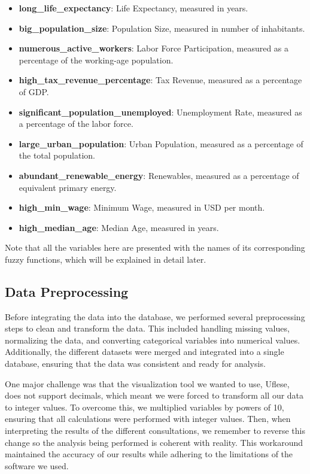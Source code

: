 \documentclass[fleqn,11pt]{article}
\begin{document}
\begin{itemize}
    \item \textbf{long\_life\_expectancy}: Life Expectancy, measured in years.
    \item \textbf{big\_population\_size}: Population Size, measured in number of inhabitants.
    \item \textbf{numerous\_active\_workers}: Labor Force Participation, measured as a percentage of the working-age population.
    \item \textbf{high\_tax\_revenue\_percentage}: Tax Revenue, measured as a percentage of GDP.
    \item \textbf{significant\_population\_unemployed}: Unemployment Rate, measured as a percentage of the labor force.
    \item \textbf{large\_urban\_population}: Urban Population, measured as a percentage of the total population.
    \item \textbf{abundant\_renewable\_energy}: Renewables, measured as a percentage of equivalent primary energy.
    \item \textbf{high\_min\_wage}: Minimum Wage, measured in USD per month.
    \item \textbf{high\_median\_age}: Median Age, measured in years.
\end{itemize}
Note that all the variables here are presented with the names of its corresponding fuzzy functions, which will be explained in detail later.

\newpage
\subsection{Data Preprocessing}

Before integrating the data into the database, we performed several preprocessing steps to clean and transform the data.
This included handling missing values, normalizing the data, and converting categorical variables into numerical values.
Additionally, the different datasets were merged and integrated into a single database, ensuring that the data was consistent and ready for analysis.

One major challenge was that the visualization tool we wanted to use, Uflese, does not support decimals, which meant we were forced to transform all our data to integer values. To overcome this, we multiplied variables by powers of 10, ensuring that all calculations were performed with integer values. Then, when interpreting the results of the different consultations, we remember to reverse this change so the analysis being performed is coherent with reality. This workaround maintained the accuracy of our results while adhering to the limitations of the software we used.
\end{document}
